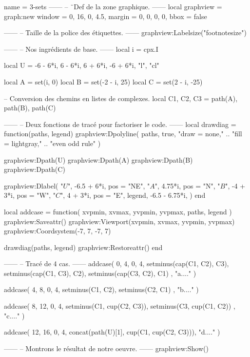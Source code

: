 \documentclass{standalone}
\begin{document}
\begin{luadraw}{name = 3-sets}
------
-- ¨Def de la zone graphique.
------
local graphview = graph:new{
  window = {0, 16, 0, 4.5},
  margin = {0, 0, 0, 0},
  bbox = false
}

------
-- Taille de la police des étiquettes.
------
graphview:Labelsize("footnotesize")

------
-- Nos ingrédients de base.
------
local i = cpx.I

local U = {
  -6 - 6*i, 6 - 6*i, 6 + 6*i, -6 + 6*i,
  "l",
  "cl"
}

local A = set(i, 0)
local B = set(-2 - i, 25)
local C = set(2 - i, -25)

-- Conversion des chemins en listes de complexes.
local C1, C2, C3 = path(A), path(B), path(C)

------
-- Deux fonctions de tracé pour factoriser le code.
------
local drawdiag = function(paths, legend)
  graphview:Dpolyline(
    paths,
    true,
       "draw = none,"
    .. "fill = lightgray,"
    .. "even odd rule"
  )

  graphview:Dpath(U)
  graphview:Dpath(A)
  graphview:Dpath(B)
  graphview:Dpath(C)

  graphview:Dlabel(
    "$U$", -6.5 + 6*i, {pos = "NE"},
    "$A$", 4.75*i, {pos = "N"},
    "$B$", -4 + 3*i, {pos = "W"},
    "$C$", 4 + 3*i, {pos = "E"},
    legend, -6.5 - 6.75*i, {}
  )
end

local addcase = function(
    xvpmin, xvmax, yvpmin, yvpmax,
    paths,
    legend
)
  graphview:Saveattr()
    graphview:Viewport(xvpmin, xvmax, yvpmin, yvpmax)
    graphview:Coordsystem(-7, 7, -7, 7)

    drawdiag(paths, legend)
  graphview:Restoreattr()
end

------
-- Tracé de 4 cas.
------
addcase(
  0, 4, 0, 4,
  {
    setminus(cap(C1, C2), C3),
    setminus(cap(C1, C3), C2),
    setminus(cap(C3, C2), C1)
  },
  "a...."
)

addcase(
  4, 8, 0, 4,
  {
    setminus(C1, C2),
    setminus(C2, C1)
  },
  "b...."
)

addcase(
  8, 12, 0, 4,
  {
    setminus(C1, cup(C2, C3)),
    setminus(C3, cup(C1, C2))
  },
  "c...."
)

addcase(
  12, 16, 0, 4,
  concat(path(U)[1], cup(C1, cup(C2, C3))),
  "d...."
)

------
-- Montrons le résultat de notre oeuvre.
------
graphview:Show()
\end{luadraw}
\end{document}
